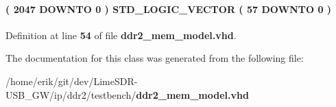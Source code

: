 \paragraph[{mem\+\_\+type}]{ {\bfseries \textcolor{vhdlchar}{(}\textcolor{vhdlchar}{ }\textcolor{vhdlchar}{ } \textcolor{vhdldigit}{2047} \textcolor{vhdlchar}{ }\textcolor{keywordflow}{D\+O\+W\+N\+TO}\textcolor{vhdlchar}{ }\textcolor{vhdlchar}{ } \textcolor{vhdldigit}{0} \textcolor{vhdlchar}{ }\textcolor{vhdlchar}{)}\textcolor{vhdlchar}{ }\textcolor{vhdlchar}{ }\textcolor{comment}{S\+T\+D\+\_\+\+L\+O\+G\+I\+C\+\_\+\+V\+E\+C\+T\+OR}\textcolor{vhdlchar}{ }\textcolor{vhdlchar}{(}\textcolor{vhdlchar}{ }\textcolor{vhdlchar}{ } \textcolor{vhdldigit}{57} \textcolor{vhdlchar}{ }\textcolor{keywordflow}{D\+O\+W\+N\+TO}\textcolor{vhdlchar}{ }\textcolor{vhdlchar}{ } \textcolor{vhdldigit}{0} \textcolor{vhdlchar}{ }\textcolor{vhdlchar}{)}\textcolor{vhdlchar}{ }} \hspace{0.3cm}{\ttfamily [Type]}}\label{classddr2__mem__model__ram__module_1_1europa_a89ba0005a716539acf2b93273574c8c5}


Definition at line {\bf 54} of file {\bf ddr2\+\_\+mem\+\_\+model.\+vhd}.



The documentation for this class was generated from the following file\+:\begin{DoxyCompactItemize}
\item 
/home/erik/git/dev/\+Lime\+S\+D\+R-\/\+U\+S\+B\+\_\+\+G\+W/ip/ddr2/testbench/{\bf ddr2\+\_\+mem\+\_\+model.\+vhd}\end{DoxyCompactItemize}
